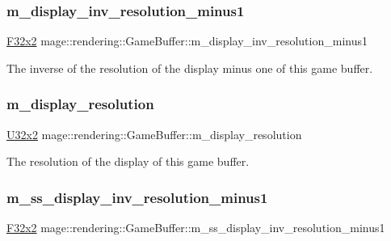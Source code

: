 \subsubsection{\texorpdfstring{m\+\_\+display\+\_\+inv\+\_\+resolution\+\_\+minus1}{m\_display\_inv\_resolution\_minus1}}
{\footnotesize\ttfamily \hyperlink{namespacemage_aa87237ad091f5cd7da612b8523fc108f}{F32x2} mage\+::rendering\+::\+Game\+Buffer\+::m\+\_\+display\+\_\+inv\+\_\+resolution\+\_\+minus1}

The inverse of the resolution of the display minus one of this game buffer. \hypertarget{structmage_1_1rendering_1_1_game_buffer_a0d1ae294ea443c48c348af75442a8f54}{}\label{structmage_1_1rendering_1_1_game_buffer_a0d1ae294ea443c48c348af75442a8f54} 
\subsubsection{\texorpdfstring{m\+\_\+display\+\_\+resolution}{m\_display\_resolution}}
{\footnotesize\ttfamily \hyperlink{namespacemage_a88e05bff0300120c013285d3dcad95c5}{U32x2} mage\+::rendering\+::\+Game\+Buffer\+::m\+\_\+display\+\_\+resolution}

The resolution of the display of this game buffer. \hypertarget{structmage_1_1rendering_1_1_game_buffer_a471b606cff83755f74f855c780c3dc2a}{}\label{structmage_1_1rendering_1_1_game_buffer_a471b606cff83755f74f855c780c3dc2a} 
\subsubsection{\texorpdfstring{m\+\_\+ss\+\_\+display\+\_\+inv\+\_\+resolution\+\_\+minus1}{m\_ss\_display\_inv\_resolution\_minus1}}
{\footnotesize\ttfamily \hyperlink{namespacemage_aa87237ad091f5cd7da612b8523fc108f}{F32x2} mage\+::rendering\+::\+Game\+Buffer\+::m\+\_\+ss\+\_\+display\+\_\+inv\+\_\+resolution\+\_\+minus1}

